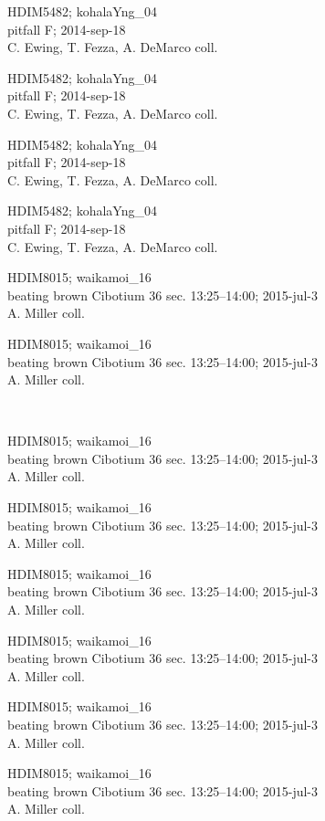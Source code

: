 \documentclass[2pt]{extarticle}
\begin{document}
\noindent
\raggedright
\parbox{0.16\textwidth}{\tiny \raggedright \rule[-0.3\baselineskip]{0pt}{10pt}HDIM5482; kohalaYng\_04\\ pitfall F; 2014-sep-18\\ C. Ewing, T. Fezza, A. DeMarco coll.}
\parbox{0.16\textwidth}{\tiny \raggedright \rule[-0.3\baselineskip]{0pt}{10pt}HDIM5482; kohalaYng\_04\\ pitfall F; 2014-sep-18\\ C. Ewing, T. Fezza, A. DeMarco coll.}
\parbox{0.16\textwidth}{\tiny \raggedright \rule[-0.3\baselineskip]{0pt}{10pt}HDIM5482; kohalaYng\_04\\ pitfall F; 2014-sep-18\\ C. Ewing, T. Fezza, A. DeMarco coll.}
\parbox{0.16\textwidth}{\tiny \raggedright \rule[-0.3\baselineskip]{0pt}{10pt}HDIM5482; kohalaYng\_04\\ pitfall F; 2014-sep-18\\ C. Ewing, T. Fezza, A. DeMarco coll.}
\parbox{0.16\textwidth}{\tiny \raggedright \rule[-0.3\baselineskip]{0pt}{10pt}HDIM8015; waikamoi\_16\\ beating brown Cibotium 36 sec. 13:25--14:00; 2015-jul-3\\ A. Miller coll.}
\parbox{0.16\textwidth}{\tiny \raggedright \rule[-0.3\baselineskip]{0pt}{10pt}HDIM8015; waikamoi\_16\\ beating brown Cibotium 36 sec. 13:25--14:00; 2015-jul-3\\ A. Miller coll.} \\ 
\vspace{0.001in} 

\noindent
\parbox{0.16\textwidth}{\tiny \raggedright \rule[-0.3\baselineskip]{0pt}{10pt}HDIM8015; waikamoi\_16\\ beating brown Cibotium 36 sec. 13:25--14:00; 2015-jul-3\\ A. Miller coll.}
\parbox{0.16\textwidth}{\tiny \raggedright \rule[-0.3\baselineskip]{0pt}{10pt}HDIM8015; waikamoi\_16\\ beating brown Cibotium 36 sec. 13:25--14:00; 2015-jul-3\\ A. Miller coll.}
\parbox{0.16\textwidth}{\tiny \raggedright \rule[-0.3\baselineskip]{0pt}{10pt}HDIM8015; waikamoi\_16\\ beating brown Cibotium 36 sec. 13:25--14:00; 2015-jul-3\\ A. Miller coll.}
\parbox{0.16\textwidth}{\tiny \raggedright \rule[-0.3\baselineskip]{0pt}{10pt}HDIM8015; waikamoi\_16\\ beating brown Cibotium 36 sec. 13:25--14:00; 2015-jul-3\\ A. Miller coll.}
\parbox{0.16\textwidth}{\tiny \raggedright \rule[-0.3\baselineskip]{0pt}{10pt}HDIM8015; waikamoi\_16\\ beating brown Cibotium 36 sec. 13:25--14:00; 2015-jul-3\\ A. Miller coll.}
\parbox{0.16\textwidth}{\tiny \raggedright \rule[-0.3\baselineskip]{0pt}{10pt}HDIM8015; waikamoi\_16\\ beating brown Cibotium 36 sec. 13:25--14:00; 2015-jul-3\\ A. Miller coll.} \\ 
\vspace{0.001in} 
\end{document}
